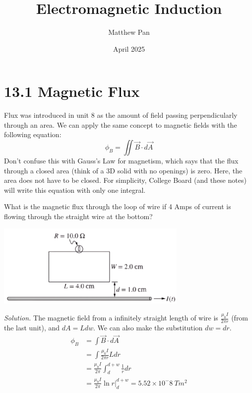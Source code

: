 \documentclass[12pt, titlepage]{article}
\title{Electromagnetic Induction}
\author{Matthew Pan}
\date{April 2025}
\begin{document}
\pagestyle{fancy}

\fancyhead{}
\fancyhead[R]{\thepage}

\maketitle

\section*{13.1 Magnetic Flux}

Flux was introduced in unit 8 as the amount of field passing perpendicularly through an area. We can apply the same concept to magnetic fields with the following equation:
\begin{equation*}
    \phi_B = \iint \vec{B} \cdot d\vec{A}
\end{equation*}
Don't confuse this with Gauss's Law for magnetism, which says that the flux through a closed area (think of a 3D solid with no openings) is zero. Here, the area does not have to be closed. For simplicity, College Board (and these notes) will write this equation with only one integral.

\begin{Problem}
    What is the magnetic flux through the loop of wire if 4 Amps of current is flowing through the straight wire at the bottom?
    \begin{center}
        \includegraphics*[height=4cm]{media/flux.png}
    \end{center}

    \tcblower
    \textit{Solution. }
    The magnetic field from a infinitely straight length of wire is $\frac{\mu_0 I}{2\pi r}$ (from the last unit), and $dA=Ldw$. We can also make the substitution $dw=dr$.
    \begin{align*}
        \phi_B &= \int \vec{B} \cdot d\vec{A} \\
        &= \int \frac{\mu_0 I}{2\pi r}L dr \\
        &= \frac{\mu_0 I}{2\pi} \int_{d}^{d+w} \frac{1}{r} dr \\
        & = \frac{\mu_0 I}{2\pi} \ln r |_{d}^{d+w} = 5.52 \times 10^-8 \ Tm^2
    \end{align*}
\end{Problem}
\end{document}
